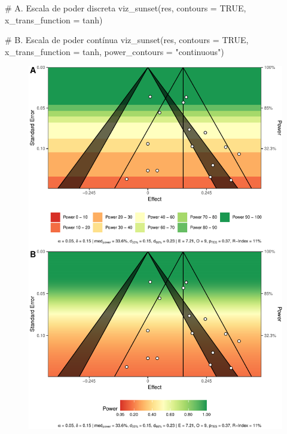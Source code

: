 \documentclass[
  bookmarksnumbered]{article}
\newenvironment{Shaded}{\begin{snugshade}}{\end{snugshade}}
\newcommand{\AttributeTok}[1]{\textcolor[rgb]{0.00,0.34,0.68}{#1}}
\newcommand{\CommentTok}[1]{\textcolor[rgb]{0.54,0.53,0.53}{#1}}
\newcommand{\ConstantTok}[1]{\textcolor[rgb]{0.67,0.33,0.00}{#1}}
\newcommand{\FunctionTok}[1]{\textcolor[rgb]{0.39,0.29,0.61}{#1}}
\newcommand{\NormalTok}[1]{\textcolor[rgb]{0.12,0.11,0.11}{#1}}
\newcommand{\StringTok}[1]{\textcolor[rgb]{0.75,0.01,0.01}{#1}}
\begin{document}
\begin{Shaded}
\begin{Highlighting}[]
\CommentTok{\# A. Escala de poder discreta}
\FunctionTok{viz\_sunset}\NormalTok{(res,}
           \AttributeTok{contours =} \ConstantTok{TRUE}\NormalTok{,}
           \AttributeTok{x\_trans\_function =}\NormalTok{ tanh)}

\CommentTok{\# B. Escala de poder contínua}
\FunctionTok{viz\_sunset}\NormalTok{(res, }
           \AttributeTok{contours =} \ConstantTok{TRUE}\NormalTok{,}
           \AttributeTok{x\_trans\_function =}\NormalTok{ tanh, }
           \AttributeTok{power\_contours =} \StringTok{"continuous"}\NormalTok{)}
\end{Highlighting}
\end{Shaded}

\begin{figure}
\centering
\includegraphics{Meta-analysis_files/figure-latex/funnel-plot3-1.pdf}

\end{figure}
\end{document}

